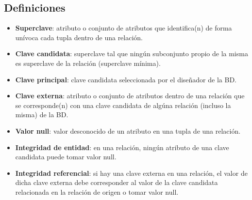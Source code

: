 \documentclass{article}
\begin{document}
\subsection{Definiciones}
\begin{itemize}
    \item \textbf{Superclave}: atributo o conjunto de atributos que identifica(n) de forma unívoca cada tupla dentro de una relación.

    \item \textbf{Clave candidata}: superclave tal que ningún subconjunto propio de la misma es superclave de la relación (superclave mínima).

    \item \textbf{Clave principal}: clave candidata seleccionada por el diseñador de la BD.

    \item \textbf{Clave externa}: atributo o conjunto de atributos dentro de una relación que se corresponde(n) con una clave candidata de algúna relación (incluso la misma) de la BD.

    \item \textbf{Valor null}: valor desconocido de un atributo en una tupla de una relación.

    \item \textbf{Integridad de entidad}: en una relación, ningún atributo de una clave candidata puede tomar valor null.

    \item \textbf{Integridad referencial}: si hay una clave externa en una relación, el valor de dicha clave externa debe corresponder al valor de la clave candidata relacionada en la relación de origen o tomar valor null.
\end{itemize}


\begin{comment}
\begin{figure}[h]
    \centering
    \texttt{[image: 1.png]}
    \caption{}
\end{figure}
\end{comment}

\begin{comment}
\begin{wrapfigure}[]{r}{0.5\linewidth}
    \centering
    \texttt{[image: 8.png]}
    \caption{}
\end{wrapfigure}
\end{comment}
\end{document}
